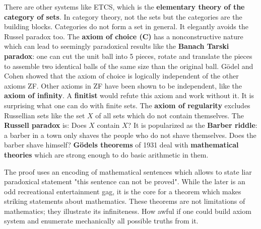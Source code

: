\documentclass[12pt]{amsart}
\def\chapter#1{ \vspace{2mm} \begin{center} \fcolorbox{green1}{green1}{ \parbox{16.2cm}{{\Large {\bf #1}}}} \vspace{2mm} \end{center} }
\begin{document}
There are other systems like ETCS, which is the {\bf elementary theory of the category of sets}. In category
theory, not the sets but the categories are the building blocks. Categories do not form a set in general. 
It elegantly avoids the Russel paradox too. 
The {\bf axiom of choice (C)} has a nonconstructive
nature which can lead to seemingly paradoxical results like the {\bf Banach Tarski paradox}:
one can cut the unit ball into 5 pieces, rotate and translate the pieces to assemble two identical balls 
of the same size than the original ball.  G\"odel and Cohen showed that
the axiom of choice is logically independent of the other axioms ZF.
Other axioms in ZF have been shown to be independent, like the {\bf axiom of infinity}. A {\bf finitist} would
refute this axiom and work without it. It is surprising what one can do with finite sets. 
The {\bf axiom of regularity} excludes Russellian sets like the set $X$ of all sets which do not contain themselves.
The {\bf Russell paradox} is: Does $X$ contain $X$? It is popularized as the {\bf Barber riddle}: 
a barber in a town only shaves the people who do not shave themselves. Does the barber shave himself? 
{\bf G\"odels theorems} of 1931 deal
with {\bf mathematical theories} which are strong enough to do basic arithmetic in them.

\parbox{16.8cm}{
\hspace{4mm}
}

The proof uses an encoding of mathematical sentences which allows to state liar paradoxical statement 
"this sentence can not be proved". While the later is an odd recreational entertainment gag, it is the 
core for a theorem which makes striking statements about mathematics. These theorems are not limitations of mathematics;
they illustrate its infiniteness. How awful if one could build axiom system and enumerate mechanically all 
possible truths from it.


 \pagebreak
{}

\chapter{Lecture 8: Probability theory}
\end{document}
